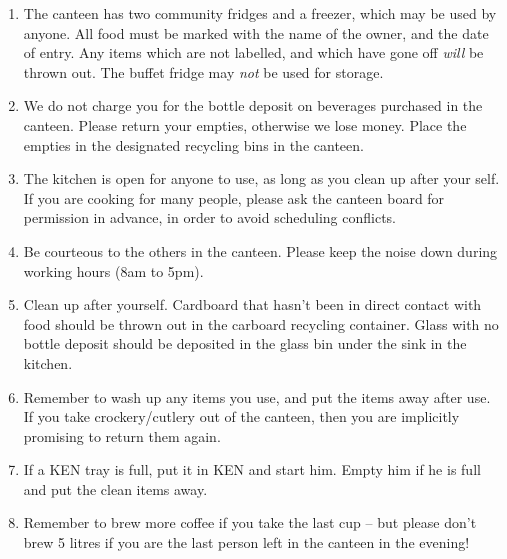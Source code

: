 \documentclass{article}
\begin{document}

\maketitle

\null
\vspace{-0.2cm}

{\fontsize{13}{15}\selectfont

\begin{enumerate}

\item The canteen has two community fridges and a freezer, which may be used by
anyone.  All food must be marked with the name of the owner, and the date of
entry. Any items which are not labelled, and which have gone off \textit{will}
be thrown out. The buffet fridge may \textit{not} be used for storage.

\item We do not charge you for the bottle deposit on beverages purchased in the
canteen. Please return your empties, otherwise we lose money. Place the empties
in the designated recycling bins in the canteen. 

\item The kitchen is open for anyone to use, as long as you clean up after your
self. If you are cooking for many people, please ask the canteen board for
permission in advance, in order to avoid scheduling conflicts.

\item Be courteous to the others in the canteen. Please keep the noise down
during working hours (8am to 5pm).

\item Clean up after yourself. Cardboard that hasn't been in direct contact
with food should be thrown out in the carboard recycling container. Glass with
no bottle deposit should be deposited in the glass bin under the sink in the
kitchen.

\item Remember to wash up any items you use, and put the items away after use.
If you take crockery/cutlery out of the canteen, then you are implicitly
promising to return them again.

\item If a KEN tray is full, put it in KEN and start him. Empty him if he is
full and put the clean items away.

\item Remember to brew more coffee if you take the last cup -- but please don't
brew 5 litres if you are the last person left in the canteen in the evening!


\end{enumerate}}
\end{document}
